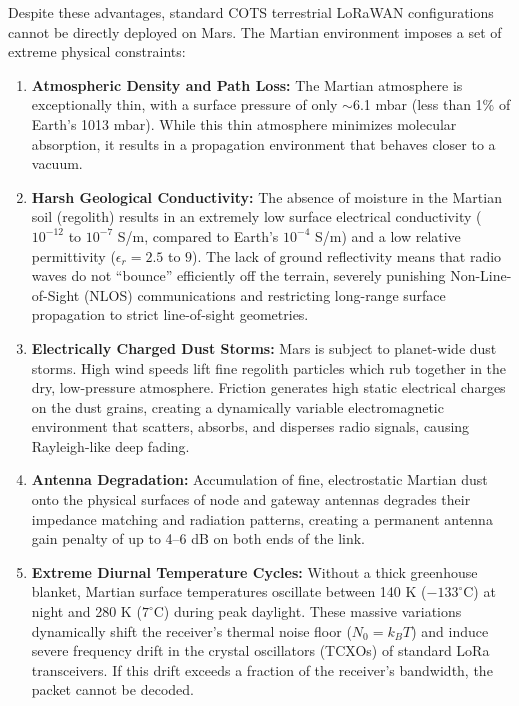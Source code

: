 \documentclass{ijuc}
\begin{document}
Despite these advantages, standard COTS terrestrial LoRaWAN configurations cannot be directly deployed on Mars. The Martian environment imposes a set of extreme physical constraints:
\begin{enumerate}
    \item \textbf{Atmospheric Density and Path Loss:} The Martian atmosphere is exceptionally thin, with a surface pressure of only $\sim$6.1 mbar (less than 1\% of Earth's 1013 mbar). While this thin atmosphere minimizes molecular absorption, it results in a propagation environment that behaves closer to a vacuum. 
    \item \textbf{Harsh Geological Conductivity:} The absence of moisture in the Martian soil (regolith) results in an extremely low surface electrical conductivity ($10^{-12}$ to $10^{-7}$ S/m, compared to Earth's $10^{-4}$ S/m) and a low relative permittivity ($\epsilon_r = 2.5$ to $9$). The lack of ground reflectivity means that radio waves do not ``bounce'' efficiently off the terrain, severely punishing Non-Line-of-Sight (NLOS) communications and restricting long-range surface propagation to strict line-of-sight geometries.
    \item \textbf{Electrically Charged Dust Storms:} Mars is subject to planet-wide dust storms. High wind speeds lift fine regolith particles which rub together in the dry, low-pressure atmosphere. Friction generates high static electrical charges on the dust grains, creating a dynamically variable electromagnetic environment that scatters, absorbs, and disperses radio signals, causing Rayleigh-like deep fading.
    \item \textbf{Antenna Degradation:} Accumulation of fine, electrostatic Martian dust onto the physical surfaces of node and gateway antennas degrades their impedance matching and radiation patterns, creating a permanent antenna gain penalty of up to 4--6 dB on both ends of the link.
    \item \textbf{Extreme Diurnal Temperature Cycles:} Without a thick greenhouse blanket, Martian surface temperatures oscillate between 140 K ($-133^\circ$C) at night and 280 K ($7^\circ$C) during peak daylight. These massive variations dynamically shift the receiver's thermal noise floor ($N_0 = k_B T$) and induce severe frequency drift in the crystal oscillators (TCXOs) of standard LoRa transceivers. If this drift exceeds a fraction of the receiver's bandwidth, the packet cannot be decoded.
\end{enumerate}
\end{document}

